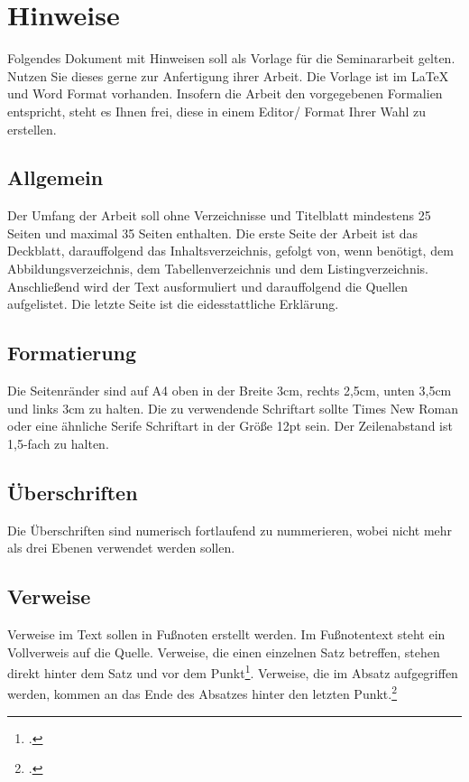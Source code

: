 \section{Hinweise}
\label{sec:hinweise}

Folgendes Dokument mit Hinweisen soll als Vorlage für die Seminararbeit gelten.
Nutzen Sie dieses gerne zur Anfertigung ihrer Arbeit.
Die Vorlage ist im \LaTeX{} und Word Format vorhanden.
Insofern die Arbeit den vorgegebenen Formalien entspricht, steht es Ihnen frei, diese in einem Editor/ Format Ihrer Wahl zu erstellen.

\subsection{Allgemein}
Der Umfang der Arbeit soll ohne Verzeichnisse und Titelblatt mindestens 25 Seiten und maximal 35 Seiten enthalten.
Die erste Seite der Arbeit ist das Deckblatt, darauffolgend das Inhaltsverzeichnis, gefolgt von, wenn benötigt, dem Abbildungsverzeichnis, dem Tabellenverzeichnis und dem Listingverzeichnis.
Anschließend wird der Text ausformuliert und darauffolgend die Quellen aufgelistet.
Die letzte Seite ist die eidesstattliche Erklärung.

\subsection{Formatierung}
Die Seitenränder sind auf A4 oben in der Breite 3cm, rechts 2,5cm, unten 3,5cm und links 3cm zu halten.
Die zu verwendende Schriftart sollte Times New Roman oder eine ähnliche Serife Schriftart in der Größe 12pt sein.
Der Zeilenabstand ist 1,5-fach zu halten.

\subsection{Überschriften}
Die Überschriften sind numerisch fortlaufend zu nummerieren, wobei nicht mehr als drei Ebenen verwendet werden sollen.

\subsection{Verweise}
Verweise im Text sollen in Fußnoten erstellt werden. 
Im Fußnotentext steht ein Vollverweis auf die Quelle. 
Verweise, die einen einzelnen Satz betreffen, stehen direkt hinter dem Satz und vor dem Punkt\footcite{example}.
Verweise, die im Absatz aufgegriffen werden, kommen an das Ende des Absatzes hinter den letzten Punkt.\footcite{example}

